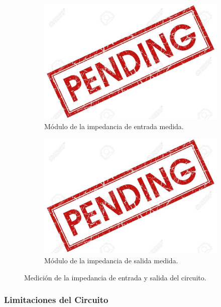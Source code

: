 \begin{figure}[H]
	\centering
	\begin{subfigure}[t]{0.49\textwidth}
	\centering
		\includegraphics[width=1.1\textwidth]{Imagenes/pend.jpg}
		\caption{Módulo de la impedancia de entrada medida.}
	\end{subfigure}
	\begin{subfigure}[t]{0.49\textwidth}
	\centering
		\includegraphics[width=1.1\textwidth]{Imagenes/pend.jpg}
		\caption{Módulo de la impedancia de salida medida.}
	\end{subfigure}
	\label{fig:zin_zout}
	\caption{Medición de la impedancia de entrada y salida del circuito.}
\end{figure}

\subsubsection{Limitaciones del Circuito}
\label{sec:limitaciones}

